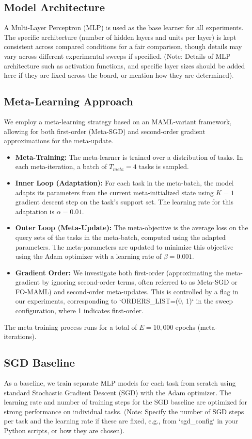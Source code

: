 \documentclass[11pt, a4paper]{article}
\begin{document}
\subsection{Model Architecture}
A Multi-Layer Perceptron (MLP) is used as the base learner for all experiments. The specific architecture (number of hidden layers and units per layer) is kept consistent across compared conditions for a fair comparison, though details may vary across different experimental sweeps if specified. (Note: Details of MLP architecture such as activation functions, and specific layer sizes should be added here if they are fixed across the board, or mention how they are determined).

\subsection{Meta-Learning Approach}
We employ a meta-learning strategy based on an MAML-variant framework, allowing for both first-order (Meta-SGD) and second-order gradient approximations for the meta-update.
\begin{itemize}
    \item \textbf{Meta-Training:} The meta-learner is trained over a distribution of tasks. In each meta-iteration, a batch of $T_{meta}=4$ tasks is sampled.
    \item \textbf{Inner Loop (Adaptation):} For each task in the meta-batch, the model adapts its parameters from the current meta-initialized state using $K=1$ gradient descent step on the task's support set. The learning rate for this adaptation is $\alpha = 0.01$.
    \item \textbf{Outer Loop (Meta-Update):} The meta-objective is the average loss on the query sets of the tasks in the meta-batch, computed using the adapted parameters. The meta-parameters are updated to minimize this objective using the Adam optimizer with a learning rate of $\beta = 0.001$.
    \item \textbf{Gradient Order:} We investigate both first-order (approximating the meta-gradient by ignoring second-order terms, often referred to as Meta-SGD or FO-MAML) and second-order meta-updates. This is controlled by a flag in our experiments, corresponding to `ORDERS_LIST=(0, 1)` in the sweep configuration, where 1 indicates first-order.
\end{itemize}
The meta-training process runs for a total of $E=10,000$ epochs (meta-iterations).

\subsection{SGD Baseline}
As a baseline, we train separate MLP models for each task from scratch using standard Stochastic Gradient Descent (SGD) with the Adam optimizer. The learning rate and number of training steps for the SGD baseline are optimized for strong performance on individual tasks. (Note: Specify the number of SGD steps per task and the learning rate if these are fixed, e.g., from `sgd_config` in your Python scripts, or how they are chosen).
\end{document}
